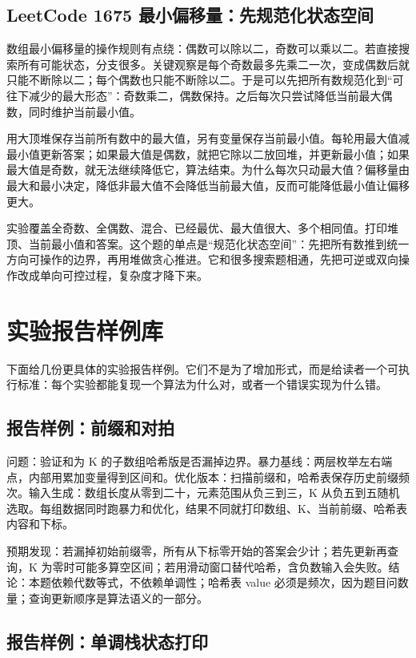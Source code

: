 \subsection{LeetCode 1675 最小偏移量：先规范化状态空间}

数组最小偏移量的操作规则有点绕：偶数可以除以二，奇数可以乘以二。若直接搜索所有可能状态，分支很多。关键观察是每个奇数最多先乘二一次，变成偶数后就只能不断除以二；每个偶数也只能不断除以二。于是可以先把所有数规范化到“可往下减少的最大形态”：奇数乘二，偶数保持。之后每次只尝试降低当前最大偶数，同时维护当前最小值。

用大顶堆保存当前所有数中的最大值，另有变量保存当前最小值。每轮用最大值减最小值更新答案；如果最大值是偶数，就把它除以二放回堆，并更新最小值；如果最大值是奇数，就无法继续降低它，算法结束。为什么每次只动最大值？偏移量由最大和最小决定，降低非最大值不会降低当前最大值，反而可能降低最小值让偏移更大。

实验覆盖全奇数、全偶数、混合、已经最优、最大值很大、多个相同值。打印堆顶、当前最小值和答案。这个题的单点是“规范化状态空间”：先把所有数推到统一方向可操作的边界，再用堆做贪心推进。它和很多搜索题相通，先把可逆或双向操作改成单向可控过程，复杂度才降下来。

\section{实验报告样例库}

下面给几份更具体的实验报告样例。它们不是为了增加形式，而是给读者一个可执行标准：每个实验都能复现一个算法为什么对，或者一个错误实现为什么错。

\subsection{报告样例：前缀和对拍}

问题：验证和为 K 的子数组哈希版是否漏掉边界。暴力基线：两层枚举左右端点，内部用累加变量得到区间和。优化版本：扫描前缀和，哈希表保存历史前缀频次。输入生成：数组长度从零到二十，元素范围从负三到三，K 从负五到五随机选取。每组数据同时跑暴力和优化，结果不同就打印数组、K、当前前缀、哈希表内容和下标。

预期发现：若漏掉初始前缀零，所有从下标零开始的答案会少计；若先更新再查询，K 为零时可能多算空区间；若用滑动窗口替代哈希，含负数输入会失败。结论：本题依赖代数等式，不依赖单调性；哈希表 value 必须是频次，因为题目问数量；查询更新顺序是算法语义的一部分。

\subsection{报告样例：单调栈状态打印}

